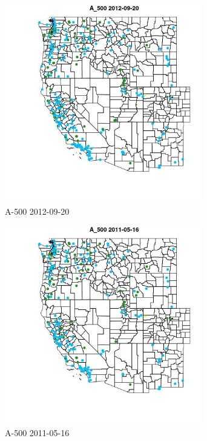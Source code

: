 \begin{figure} 
\centering  
\includegraphics[width=0.77\textwidth]{Code_Outputs/ML_input_report_ML_input_PM25_Step5_part_d_de_duplicated_aves_ML_input_MapObsA_5002012-09-20.jpg} 
\caption{\label{fig:ML_input_report_ML_input_PM25_Step5_part_d_de_duplicated_aves_ML_inputMapObsA_5002012-09-20}A-500 2012-09-20} 
\end{figure} 
 

\begin{figure} 
\centering  
\includegraphics[width=0.77\textwidth]{Code_Outputs/ML_input_report_ML_input_PM25_Step5_part_d_de_duplicated_aves_ML_input_MapObsA_5002011-05-16.jpg} 
\caption{\label{fig:ML_input_report_ML_input_PM25_Step5_part_d_de_duplicated_aves_ML_inputMapObsA_5002011-05-16}A-500 2011-05-16} 
\end{figure} 
 

